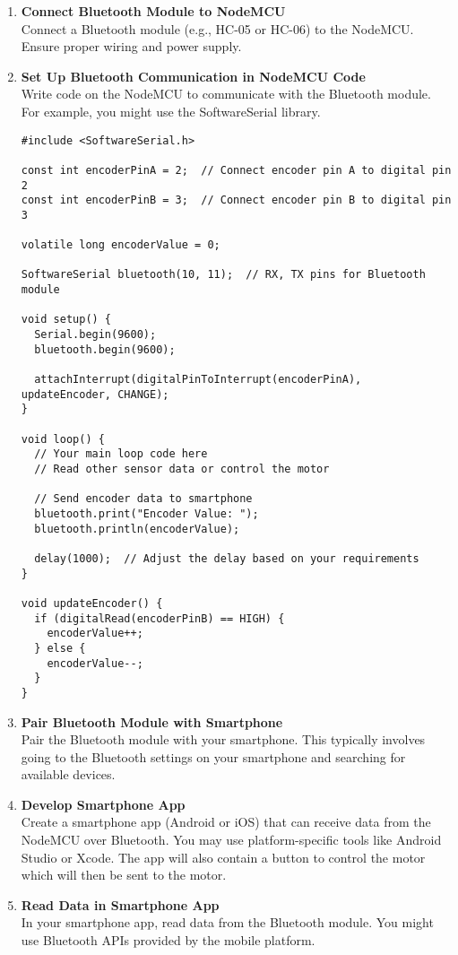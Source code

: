 \documentclass[a4,10pt]{report}
\begin{document}
\begin{enumerate}

    \item \textbf{Connect Bluetooth Module to NodeMCU} \\ Connect a Bluetooth module (e.g., HC-05 or HC-06) to the NodeMCU. Ensure proper wiring and power supply.
    \item \textbf{Set Up Bluetooth Communication in NodeMCU Code} \\ Write code on the NodeMCU to communicate with the Bluetooth module. For example, you might use the SoftwareSerial library.
\begin{lstlisting}
#include <SoftwareSerial.h>

const int encoderPinA = 2;  // Connect encoder pin A to digital pin 2
const int encoderPinB = 3;  // Connect encoder pin B to digital pin 3

volatile long encoderValue = 0;

SoftwareSerial bluetooth(10, 11);  // RX, TX pins for Bluetooth module

void setup() {
  Serial.begin(9600);
  bluetooth.begin(9600);

  attachInterrupt(digitalPinToInterrupt(encoderPinA), updateEncoder, CHANGE);
}

void loop() {
  // Your main loop code here
  // Read other sensor data or control the motor

  // Send encoder data to smartphone
  bluetooth.print("Encoder Value: ");
  bluetooth.println(encoderValue);

  delay(1000);  // Adjust the delay based on your requirements
}

void updateEncoder() {
  if (digitalRead(encoderPinB) == HIGH) {
    encoderValue++;
  } else {
    encoderValue--;
  }
}
\end{lstlisting}
    \item \textbf{Pair Bluetooth Module with Smartphone} \\ Pair the Bluetooth module with your smartphone. This typically involves going to the Bluetooth settings on your smartphone and searching for available devices.
    \item \textbf{Develop Smartphone App} \\ Create a smartphone app (Android or iOS) that can receive data from the NodeMCU over Bluetooth. You may use platform-specific tools like Android Studio or Xcode. The app will also contain a button to control the motor which will then be sent to the motor.
    \item \textbf{Read Data in Smartphone App} \\ In your smartphone app, read data from the Bluetooth module. You might use Bluetooth APIs provided by the mobile platform.

\end{enumerate}
\end{document}
